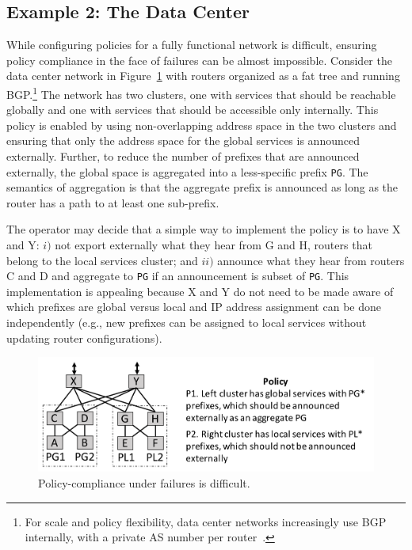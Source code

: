 \documentclass{sig-alternate-10pt}
\newcommand{\CD}[1]{\texttt{\small #1}}  %
\providecommand{\DIFdelend}{} %
\begin{document}
\DIFdelend \subsection{Example 2:  The Data Center}

 While configuring policies for a fully functional network is difficult, ensuring policy compliance in the face of failures can be almost impossible. Consider the data center network in Figure~\ref{fig:example2} with routers organized as a fat tree and running BGP.\footnote{For scale and policy flexibility, data center networks increasingly use BGP internally, with a private AS number per router~\cite{bgp-in-dc}.} The network has two clusters, one with services that should be reachable globally and one with services that should be accessible only internally. This policy is enabled by using non-overlapping address space in the two clusters and ensuring that only the address space for the global services is announced externally. Further, to reduce the number of prefixes that are announced externally, the global space is aggregated into a less-specific prefix \CD{PG}. The semantics of aggregation is that the aggregate prefix is announced as long as the router has a path to at least one sub-prefix.

The operator may decide that a simple way to implement the policy is to have X and Y: $i)$ not export externally what they hear from G and H, routers that belong to the local services cluster; and $ii)$ announce what they hear from routers C and D and aggregate to \CD{PG} if an announcement is subset of \CD{PG}. This implementation is appealing because X and Y do not need to be made aware of which prefixes are global versus local and IP address assignment can be done independently (e.g., new prefixes can be assigned to local services without updating router configurations).

\begin{figure}[t!]
  \centering
  \includegraphics[width=\columnwidth]{figures/example2}
  \caption{Policy-compliance under failures is difficult.}
  \label{fig:example2}
  \vspace{-1em}
\end{figure}
\end{document}
